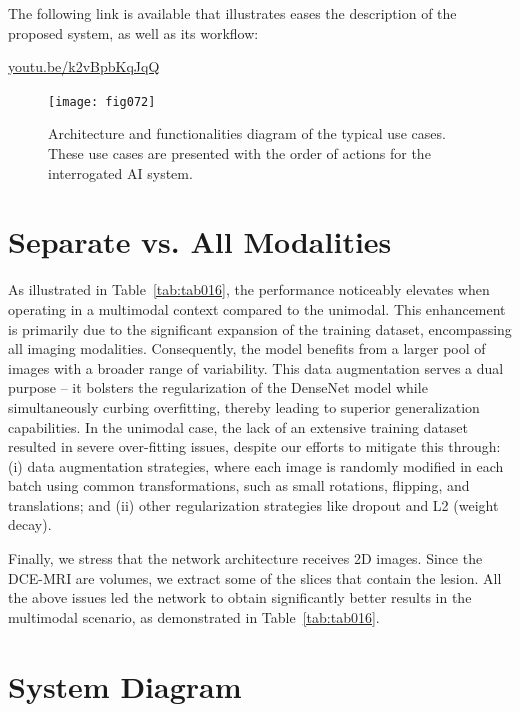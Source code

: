 \vspace{2mm}

\noindent
The following link is available that illustrates eases the description of the proposed system, as well as its workflow:

\vspace{2mm}

\noindent
\href{https://youtu.be/k2vBpbKqJqQ}{youtu.be/k2vBpbKqJqQ}

\begin{figure}[htbp]
\centering
\texttt{[image: fig072]}
\caption{Architecture and functionalities diagram of the typical use cases. These use cases are presented with the order of actions for the interrogated AI system.}
\label{fig:fig072}
\end{figure}

\section{Separate vs. All Modalities}
\label{sec:app004008}

As illustrated in Table~\ref{tab:tab016}, the performance noticeably elevates when operating in a multimodal context compared to the unimodal.
This enhancement is primarily due to the significant expansion of the training dataset, encompassing all imaging modalities.
Consequently, the model benefits from a larger pool of images with a broader range of variability.
This data augmentation serves a dual purpose -- it bolsters the regularization of the DenseNet model while simultaneously curbing overfitting, thereby leading to superior generalization capabilities.
In the unimodal case, the lack of an extensive training dataset resulted in severe over-fitting issues, despite our efforts to mitigate this through:
(i) data augmentation strategies, where each image is randomly modified in each batch using common transformations, such as small rotations, flipping, and translations; and
(ii) other regularization strategies like dropout and L2 (weight decay).

Finally, we stress that the network architecture receives 2D images.
Since the \ac{DCE-MRI} are volumes, we extract some of the slices that contain the lesion.
All the above issues led the network to obtain significantly better results in the multimodal scenario, as demonstrated in Table~\ref{tab:tab016}.

\section{System Diagram}
\label{sec:app004009}

